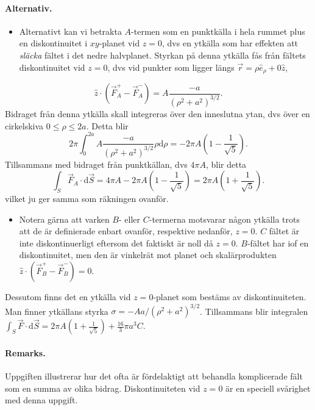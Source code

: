 \documentclass[%
oneside,                 %
final,                   %
10pt]{article}
\newenvironment{doconceexercise}{}{}
\begin{document}
\begin{doconceexercise}
\paragraph{Alternativ.}
\begin{itemize}
\item Alternativt kan vi betrakta $A$-termen som en punktkälla i hela rummet plus en diskontinuitet i $xy$-planet vid $z=0$, dvs en ytkälla som har effekten att \emph{släcka} fältet i det nedre halvplanet. Styrkan på denna ytkälla fås från fältets diskontinuitet vid $z=0$, dvs vid punkter som ligger längs $\vec{r} = \rho \hat{e}_\rho + 0 \hat{z}$,
\end{itemize}

\noindent
$$
\hat{z} \cdot \left( \vec{F}_A^+ - \vec{F}_A^- \right) = 
A \frac{-a}{(\rho^2 + a^2)^{3/2}}.
$$ 
Bidraget från denna ytkälla skall integreras över den inneslutna ytan, dvs över en cirkelskiva $0 \leq \rho \leq 2a$. Detta blir
$$
2 \pi \int_0^{2a} A \frac{- a}{(\rho^2 + a^2)^{3/2}} \rho \mbox{d}\rho = -2 \pi A \left( 1 -\frac{1}{\sqrt{5}} \right).
$$
Tillsammans med bidraget från punktkällan, dvs $4 \pi A$, blir detta
$$
\int_S \vec{F}_A \cdot \mbox{d}\vec{S} = 4 \pi A  -  2 \pi A \left( 1 -\frac{1}{\sqrt{5}} \right) = 2 \pi A \left( 1 + \frac{1}{\sqrt{5}} \right).
$$
vilket ju ger samma som räkningen ovanför.

\begin{itemize}
\item Notera gärna att varken $B$- eller $C$-termerna motsvarar någon ytkälla trots att de är definierade enbart ovanför, respektive nedanför, $z=0$. $C$ fältet är inte diskontinuerligt eftersom det faktiskt är noll då $z=0$. $B$-fältet har iof en diskontinuitet, men den är vinkelrät mot planet och skalärprodukten $\hat{z} \cdot \left( \vec{F}_B^+ - \vec{F}_B^- \right) = 0$. 
\end{itemize}

\noindent
Dessutom finns det en ytkälla vid $z=0$-planet som bestäms av
diskontinuiteten. Man finner ytkällans styrka $\sigma = -A a / (\rho^2
+ a^2)^{3/2}$.
Tillsammans blir integralen $\int_S \vec{F} \cdot \mbox{d}\vec{S} = 2
\pi A \left(1 + \frac{1}{\sqrt{5}} \right) + \frac{16}{3} \pi a^3 C$.



\paragraph{Remarks.}
Uppgiften illustrerar hur det ofta är fördelaktigt att behandla komplicerade fält som en summa av olika bidrag. Diskontinuiteten vid $z=0$ är en speciell svårighet med denna uppgift.


\end{doconceexercise}


\end{document}
